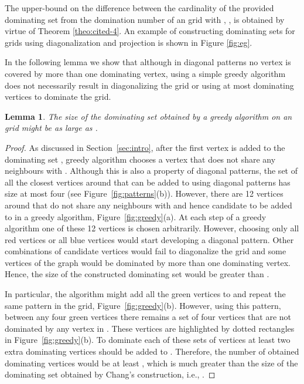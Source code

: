 \documentclass[letterpaper, 10pt, conference]{ieeeconf}
\newtheorem{lemma}[theorem]{Lemma}
\theoremstyle{definition}
\theoremstyle{remark}
\begin{document}
The upper-bound on the difference between the cardinality of the provided dominating set  from the domination number of an  grid  with , , is obtained by virtue of Theorem \ref{theo:cited-4}. An example of constructing dominating sets for grids using diagonalization and projection is shown in Figure \ref{fig:eg}.

In the following lemma we show that although in diagonal patterns no vertex is covered by more than one dominating vertex, using a simple greedy algorithm does not necessarily result in diagonalizing the grid or using at most  dominating vertices to dominate the grid. 

\begin{lemma}
\label{lem:greedy-grid}
The size of the dominating set obtained by a greedy algorithm on an  grid  might be as large as .
\end{lemma}

\begin{proof}
As discussed in Section~\ref{sec:intro}, after the first vertex  is added to the dominating set , greedy algorithm chooses a vertex that does not share any neighbours with . Although this is also a property of diagonal patterns, the set of all the closest vertices around  that can be added to  using diagonal patterns has size at most four (see Figure~\ref{fig:patterns}(b)). However, there are 12 vertices around  that do not share any neighbours with  and hence candidate to be added to  in a  greedy algorithm, Figure~\ref{fig:greedy}(a). At each step of a greedy algorithm one of these 12 vertices is chosen arbitrarily. However, choosing only all red vertices or all blue vertices would start developing a diagonal pattern. Other combinations of candidate vertices would fail to diagonalize the grid and some vertices of the graph would be dominated by more than one dominating vertex. Hence, the size of the constructed dominating set would be greater than .

In particular, the algorithm might add all the green vertices to  and repeat the same pattern in the grid, Figure~\ref{fig:greedy}(b). However, using this pattern, between any four green vertices there remains a set of four vertices that are not dominated by any vertex in . These vertices are highlighted by dotted rectangles in Figure~\ref{fig:greedy}(b). To dominate each of these sets of vertices at least two extra dominating vertices should be added to . Therefore, the number of obtained dominating vertices would be at least , which is much greater than the size of the dominating set obtained by Chang's construction, i.e., .
\end{proof}
\end{document}
